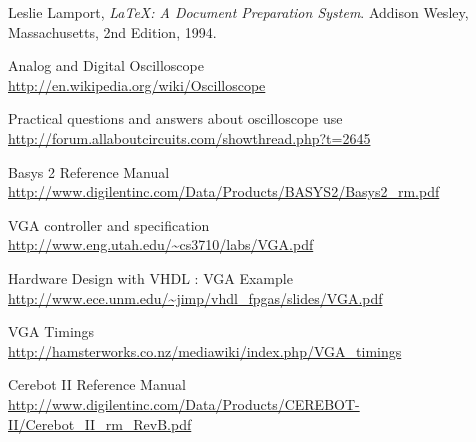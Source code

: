 \begin{thebibliography}{99}

  Leslie Lamport,
  \emph{\LaTeX: A Document Preparation System}.
  Addison Wesley, Massachusetts,
  2nd Edition,
  1994.

 Analog and Digital Oscilloscope\\
\url{ http://en.wikipedia.org/wiki/Oscilloscope}

 Practical questions and answers about oscilloscope use\\
\url{ http://forum.allaboutcircuits.com/showthread.php?t=2645 }

 Basys 2 Reference Manual\\
\url{ http://www.digilentinc.com/Data/Products/BASYS2/Basys2\_rm.pdf }

 VGA controller and specification\\
\url{ http://www.eng.utah.edu/~cs3710/labs/VGA.pdf }

 Hardware Design with VHDL : VGA Example\\
\url{ http://www.ece.unm.edu/~jimp/vhdl_fpgas/slides/VGA.pdf }

 VGA Timings\\
\url{ http://hamsterworks.co.nz/mediawiki/index.php/VGA_timings }


 Cerebot II Reference Manual\\
\url{ http://www.digilentinc.com/Data/Products/CEREBOT-II/Cerebot\_II\_rm\_RevB.pdf }
\end{thebibliography}